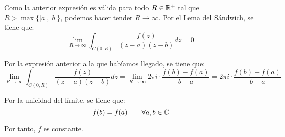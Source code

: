 \begin{ejercicio}
    Como la anterior expresión es válida para todo $R\in \mathbb{R}^+$ tal que $R>\max\{|a|,|b|\}$, podemos hacer tender $R\to \infty$. Por el Lema del Sándwich, se tiene que:
    \begin{equation*}
        \lim_{R\to \infty} \int_{C(0,R)} \frac{f(z)}{(z-a)(z-b)}dz = 0
    \end{equation*}

    Por la expresión anterior a la que habíamos llegado, se tiene que:
    \begin{equation*}
        \lim_{R\to \infty} \int_{C(0,R)} \frac{f(z)}{(z-a)(z-b)}dz = \lim_{R\to \infty} 2\pi i \cdot \frac{f(b)-f(a)}{b-a} = 2\pi i \cdot \frac{f(b)-f(a)}{b-a}
    \end{equation*}

    Por la unicidad del límite, se tiene que:
    \begin{equation*}
        f(b)=f(a) \qquad \forall a,b\in \mathbb{C}
    \end{equation*}

    Por tanto, $f$ es constante.
\end{ejercicio}

